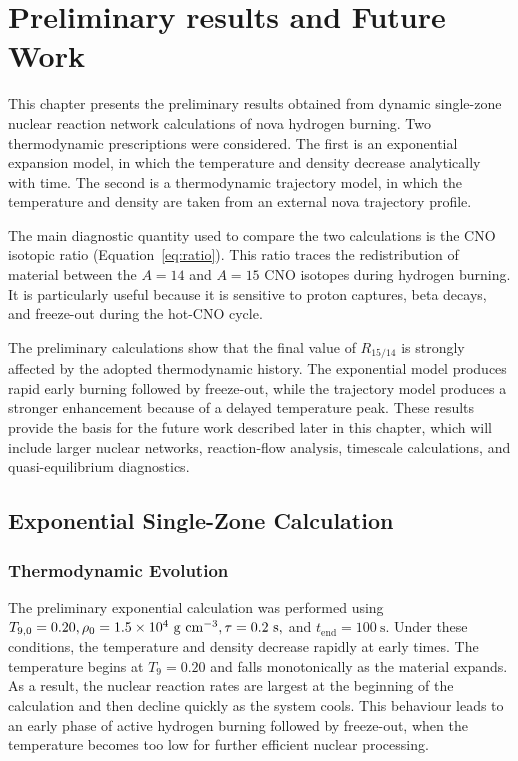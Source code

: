 
\chapter{Preliminary results and Future Work} %
\label{Chapter3}

This chapter presents the preliminary results obtained from dynamic single-zone nuclear reaction network calculations of nova hydrogen burning. Two thermodynamic prescriptions were considered. The first is an exponential expansion model, in which the temperature and density decrease analytically with time. The second is a thermodynamic trajectory model, in which the temperature and density are taken from an external nova trajectory profile.

The main diagnostic quantity used to compare the two calculations is the CNO isotopic ratio (Equation~\ref{eq:ratio}). This ratio traces the redistribution of material between the $A=14$ and $A=15$ CNO isotopes during hydrogen burning. It is particularly useful because it is sensitive to proton captures, beta decays, and freeze-out during the hot-CNO cycle.

The preliminary calculations show that the final value of $R_{15/14}$ is strongly affected by the adopted thermodynamic history. The exponential model produces rapid early burning followed by freeze-out, while the trajectory model produces a stronger enhancement because of a delayed temperature peak. These results provide the basis for the future work described later in this chapter, which will include larger nuclear networks, reaction-flow analysis, timescale calculations, and quasi-equilibrium diagnostics.

\section{Exponential Single-Zone Calculation}

\subsection{Thermodynamic Evolution}

The preliminary exponential calculation was performed using $T_{9,0}=0.20, \rho_0 = 1.5\times10^4~\mathrm{g~cm^{-3}},\\ \tau = 0.2~\mathrm{s},$ and $t_{\mathrm{end}} = 100~\mathrm{s}$. Under these conditions, the temperature and density decrease rapidly at early times. The temperature begins at $T_9=0.20$ and falls monotonically as the material expands. As a result, the nuclear reaction rates are largest at the beginning of the calculation and then decline quickly as the system cools. This behaviour leads to an early phase of active hydrogen burning followed by freeze-out, when the temperature becomes too low for further efficient nuclear processing.

